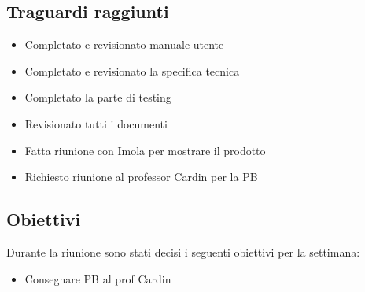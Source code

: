 \documentclass[12pt]{article}
\begin{document}
\subsection{Traguardi raggiunti}
\begin{itemize}
    \item Completato e revisionato manuale utente
    \item Completato e revisionato la specifica tecnica
    \item Completato la parte di testing
    \item Revisionato tutti i documenti
    \item Fatta riunione con Imola per mostrare il prodotto
    \item Richiesto riunione al professor Cardin per la PB
    
\end{itemize}

\subsection{Obiettivi}
Durante la riunione sono stati decisi i seguenti obiettivi per la settimana:
\begin{itemize}
    \item Consegnare PB al prof Cardin
\end{itemize}
\end{document}
